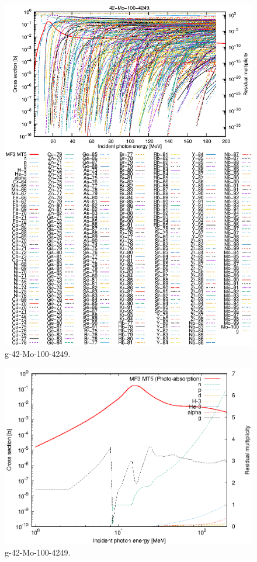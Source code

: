 \begin{figure}
 \includegraphics[width=\linewidth]{eps/g_42-Mo-100_4249.eps}
  \caption{g-42-Mo-100-4249.}
\end{figure}
\newpage \clearpage

\begin{figure}
 \includegraphics[width=\linewidth]{eps-log/g_42-Mo-100_4249.eps}
 \caption{g-42-Mo-100-4249.}
\end{figure}
\newpage \clearpage

